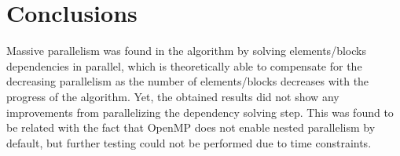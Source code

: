 \documentclass[../thesis]{subfiles}
\begin{document}
	\chapter{Conclusions}
	\label{chp:conclusions}

	Massive parallelism was found in the algorithm by solving elements/blocks dependencies in parallel, which is theoretically able to compensate for the decreasing parallelism as the number of elements/blocks decreases with the progress of the algorithm. Yet, the obtained results did not show any improvements from parallelizing the dependency solving step. This was found to be related with the fact that OpenMP does not enable nested parallelism by default, but further testing could not be performed due to time constraints.
\end{document}
